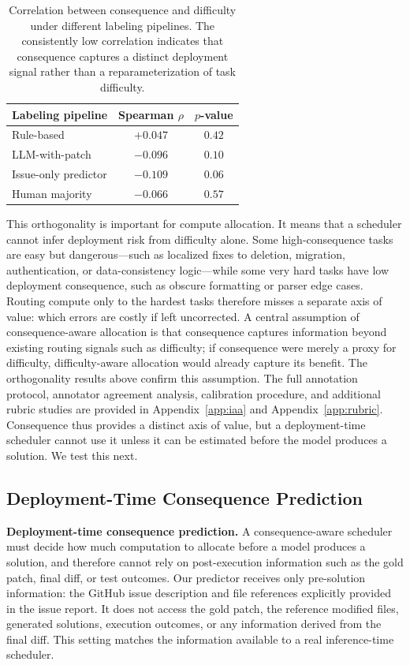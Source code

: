 \documentclass{article}
\begin{document}
\begin{table}[t]
\centering
\caption{Correlation between consequence and difficulty under different labeling pipelines. The consistently low correlation indicates that consequence captures a distinct deployment signal rather than a reparameterization of task difficulty.}
\label{tab:consequence_orthogonality}
\small
\begin{tabular}{lcc}
\toprule
Labeling pipeline & Spearman $\rho$ & $p$-value \\
\midrule
Rule-based & $+0.047$ & $0.42$ \\
LLM-with-patch & $-0.096$ & $0.10$ \\
Issue-only predictor & $-0.109$ & $0.06$ \\
Human majority & $-0.066$ & $0.57$ \\
\bottomrule
\end{tabular}
\end{table}

This orthogonality is important for compute allocation. It means that a scheduler cannot infer deployment risk from difficulty alone. Some high-consequence tasks are easy but dangerous---such as localized fixes to deletion, migration, authentication, or data-consistency logic---while some very hard tasks have low deployment consequence, such as obscure formatting or parser edge cases. Routing compute only to the hardest tasks therefore misses a separate axis of value: which errors are costly if left uncorrected. A central assumption of consequence-aware allocation is that consequence captures information beyond existing routing signals such as difficulty; if consequence were merely a proxy for difficulty, difficulty-aware allocation would already capture its benefit. The orthogonality results above confirm this assumption. The full annotation protocol, annotator agreement analysis, calibration procedure, and additional rubric studies are provided in Appendix~\ref{app:iaa} and Appendix~\ref{app:rubric}.
Consequence thus provides a distinct axis of value, but a deployment-time scheduler cannot use it unless it can be estimated before the model produces a solution. We test this next.

\subsection{Deployment-Time Consequence Prediction}
\label{sec:pred}

\textbf{Deployment-time consequence prediction.}
A consequence-aware scheduler must decide how much computation to allocate before a model produces a solution, and therefore cannot rely on post-execution information such as the gold patch, final diff, or test outcomes. Our predictor receives only pre-solution information: the GitHub issue description and file references explicitly provided in the issue report. It does not access the gold patch, the reference modified files, generated solutions, execution outcomes, or any information derived from the final diff. This setting matches the information available to a real inference-time scheduler.
\end{document}
